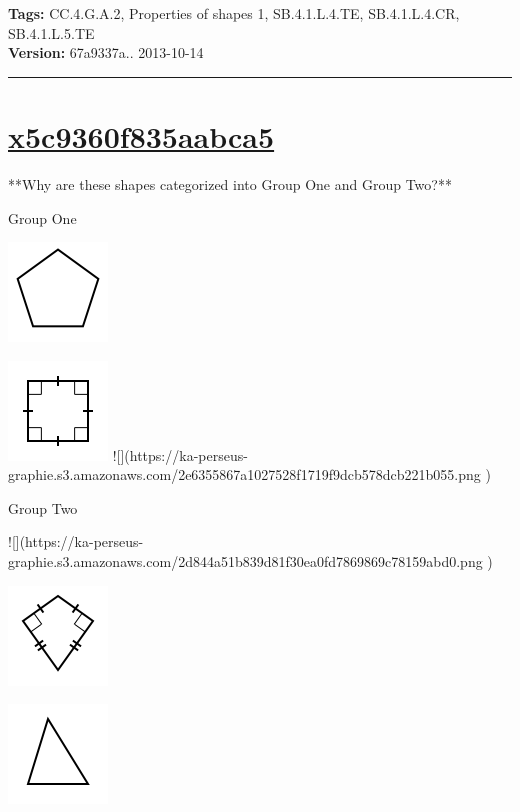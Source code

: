 \documentclass[twocolumn,10pt]{article}
\def\shrinkfactor{0.55}
\begin{document}
\medskip
\noindent
\textbf{Tags:} {\footnotesize CC.4.G.A.2, Properties of shapes 1, SB.4.1.L.4.TE, SB.4.1.L.4.CR, SB.4.1.L.5.TE}\\
\textbf{Version:} 67a9337a.. 2013-10-14
\smallskip\hrule





\section{\href{https://www.khanacademy.org/devadmin/content/items/x5c9360f835aabca5}{x5c9360f835aabca5}}

\noindent
**Why are these shapes categorized into Group One and Group Two?** 

Group One 



\includegraphics[scale=\shrinkfactor]{figures/498a6b09730fdba2360826c138eeee142e8cccc1.png}

\includegraphics[scale=\shrinkfactor]{figures/d7e87a3d879924b2a1dbf230d26c2ff999761993.png}
![](https://ka-perseus-graphie.s3.amazonaws.com/2e6355867a1027528f1719f9dcb578dcb221b055.png
)

Group Two

![](https://ka-perseus-graphie.s3.amazonaws.com/2d844a51b839d81f30ea0fd7869869c78159abd0.png
 )

\includegraphics[scale=\shrinkfactor]{figures/be0b4c8e85edc438c12910c91d66875e8fcd2372.png}

\includegraphics[scale=\shrinkfactor]{figures/ee7f87a00acb47dec4f2b2eed9a6741b21afc47d.png}
\end{document}
